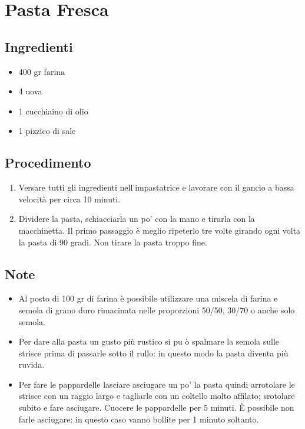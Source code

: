 \section{Pasta Fresca}
\subsection{Ingredienti}
\begin{itemize}
\item 400 gr farina  
\item 4 uova  
\item 1 cucchiaino di olio  
\item 1 pizzico di sale
\end{itemize}
\subsection{Procedimento}
\begin{enumerate}
\item  Versare tutti gli ingredienti nell'impastatrice e lavorare con il gancio a bassa velocità per circa 10 minuti.  
\item  Dividere la pasta, schiacciarla un po' con la mano e tirarla con la macchinetta. Il primo passaggio è meglio ripeterlo tre volte girando ogni volta la pasta di 90 gradi. Non tirare la pasta troppo fine.
\end{enumerate}
\subsection{Note}
\begin{itemize}
\item Al posto di 100 gr di farina è possibile utilizzare una miscela di farina e semola di grano duro rimacinata nelle proporzioni 50/50, 30/70 o anche solo semola.   
\item Per dare alla pasta un gusto più rustico si pu ò spalmare la semola sulle strisce prima di passarle sotto il rullo: in questo modo la pasta diventa più ruvida.  
\item Per fare le pappardelle lasciare asciugare un po' la pasta quindi arrotolare le strisce con un raggio largo e tagliarle con un coltello molto affilato; srotolare subito e fare asciugare. Cuocere le pappardelle per 5 minuti. È possibile non farle asciugare: in questo caso vanno bollite per 1 minuto soltanto.
\end{itemize}
